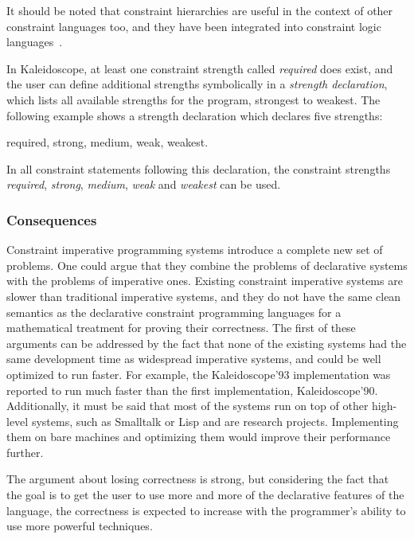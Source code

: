 It should be noted that constraint hierarchies are useful in the
context of other constraint languages too, and they have been
integrated into constraint logic languages~\cite{wilson94hclp}.

In Kaleidoscope, at least one constraint strength called {\em
  required} does exist, and the user can define additional strengths
symbolically in a {\em strength declaration}, which lists all
available strengths for the program, strongest to weakest.  The
following example shows a strength declaration which declares five
strengths:
%
\begin{ttlprog}
 required, strong, medium, weak, weakest.
\end{ttlprog}
%
In all constraint statements following this declaration, the
constraint strengths {\em required}, {\em strong}, {\em medium}, {\em
  weak} and {\em weakest} can be used.

\subsubsection{Consequences}

Constraint imperative programming systems introduce a complete new set
of problems.  One could argue that they combine the problems of
declarative systems with the problems of imperative ones.  Existing
constraint imperative systems are slower than traditional imperative
systems, and they do not have the same clean semantics as the
declarative constraint programming languages for a mathematical
treatment for proving their correctness.  The first of these arguments
can be addressed by the fact that none of the existing systems had the
same development time as widespread imperative systems, and could be
well optimized to run faster.  For example, the Kaleidoscope'93
implementation was reported to run much faster than the first
implementation, Kaleidoscope'90.  Additionally, it must be said that
most of the systems run on top of other high-level systems, such as
Smalltalk or Lisp and are research projects.  Implementing them on
bare machines and optimizing them would improve their performance
further.

The argument about losing correctness is strong, but considering the
fact that the goal is to get the user to use more and more of the
declarative features of the language, the correctness is expected to
increase with the programmer's ability to use more powerful
techniques.




